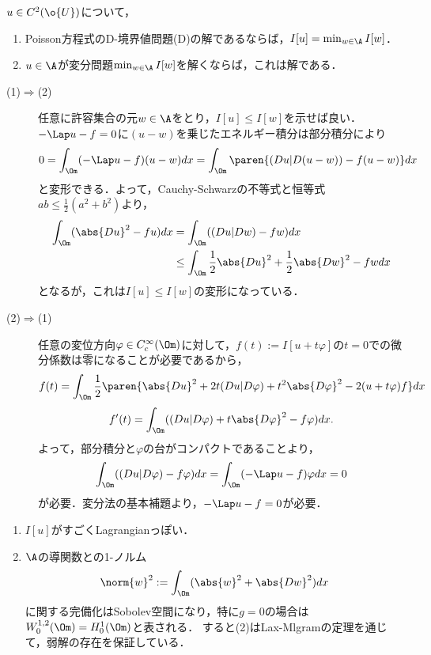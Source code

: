 \documentclass[uplatex,dvipdfmx]{jsreport}
\begin{document}
\begin{theorem}
    $u\in C^2(\o{U})$について，
    \begin{enumerate}
        \item Poisson方程式のD-境界値問題(D)の解であるならば，$I[u]=\min_{w\in\A}I[w]$．
        \item $u\in\A$が変分問題$\min_{w\in\A}I[w]$を解くならば，これは解である．
    \end{enumerate}
\end{theorem}
\begin{Proof}\mbox{}
    \begin{description}
        \item[(1)$\Rightarrow$(2)] 任意に許容集合の元$w\in\A$をとり，$I[u]\le I[w]$を示せば良い．
        $-\Lap u-f=0$に$(u-w)$を乗じたエネルギー積分は部分積分により
        \[0=\int_\Om(-\Lap u-f)(u-w)dx=\int_\Om\paren{(Du|D(u-w))-f(u-w)}dx\]
        と変形できる．よって，Cauchy-Schwarzの不等式と恒等式$ab\le\frac{1}{2}(a^2+b^2)$より，
        \begin{align*}
            \int_\Om(\abs{Du}^2-fu)dx&=\int_\Om((Du|Dw)-fw)dx\\
            &\le\int_\Om\frac{1}{2}\abs{Du}^2+\frac{1}{2}\abs{Dw}^2-fwdx
        \end{align*}
        となるが，これは$I[u]\le I[w]$の変形になっている．
        \item[(2)$\Rightarrow$(1)] 任意の変位方向$\varphi\in C^\infty_c(\Om)$に対して，$f(t):=I[u+t\varphi]$の$t=0$での微分係数は零になることが必要であるから，
        \[f(t)=\int_\Om\frac{1}{2}\paren{\abs{Du}^2+2t(Du|D\varphi)+t^2\abs{D\varphi}^2-2(u+t\varphi)f}dx\]
        \[f'(t)=\int_\Om((Du|D\varphi)+t\abs{D\varphi}^2-f\varphi)dx.\]
        よって，部分積分と$\varphi$の台がコンパクトであることより，
        \[\int_\Om((Du|D\varphi)-f\varphi)dx=\int_\Om(-\Lap u-f)\varphi dx=0\]
        が必要．変分法の基本補題より，$-\Lap u-f=0$が必要．
    \end{description}
\end{Proof}
\begin{remarks}\mbox{}
    \begin{enumerate}
        \item $I[u]$がすごくLagrangianっぽい．
        \item $\A$の導関数との1-ノルム
        \[\norm{w}^2:=\int_\Om(\abs{w}^2+\abs{Dw}^2)dx\]
        に関する完備化はSobolev空間になり，特に$g=0$の場合は$W_0^{1,2}(\Om)=H_0^1(\Om)$と表される．
        すると(2)はLax-Mlgramの定理を通じて，弱解の存在を保証している．
    \end{enumerate}
\end{remarks}
\end{document}

